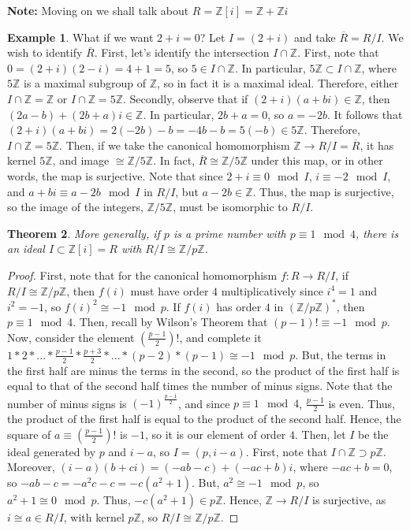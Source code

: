 \documentclass[12pt]{article}
\newtheorem{thm}{Theorem}[section]
\theoremstyle{definition}
\newtheorem{eg}[thm]{Example}
\theoremstyle{remark}
\numberwithin{equation}{section}
\newcommand\Z{\mathbb Z}    %
\begin{document}
\vspace{15pt}

\textbf{Note:} Moving on we shall talk about $R = \Z[i] = \Z + \Z i$


\begin{eg}
        What if we want $2+i = 0$? Let $I = (2+i)$ and take $\overline{R} = R/I$. We wish to identify $\overline{R}$. First, let's identify the intersection $I \cap \Z$. First, note that $0 = (2+i)(2-i) = 4+1 = 5$, so $5 \in I\cap \Z$. In particular, $5\Z \subset I\cap \Z$, where $5\Z$ is a maximal subgroup of $\Z$, so in fact it is a maximal ideal. Therefore, either $I\cap \Z = \Z$ or $I\cap \Z = 5\Z$. Secondly, observe that if $(2+i)(a+bi) \in \Z$, then $(2a-b)+(2b+a)i \in \Z$. In particular, $2b+a = 0$, so $a = -2b$. It follows that $(2+i)(a+bi) = 2(-2b)-b = -4b - b = 5(-b) \in 5\Z$. Therefore, $I\cap \Z = 5\Z$. Then, if we take the canonical homomorphism $\Z\rightarrow R/I = \overline{R}$, it has kernel $5\Z$, and image $\cong \Z/5\Z$. In fact, $\overline{R} \cong \Z/5\Z$ under this map, or in other words, the map is surjective. Note that since $2+i \equiv 0 \mod I$, $i \equiv -2 \mod I$, and $a+bi \equiv a-2b \mod I$ in $R/I$, but $a-2b \in \Z$. Thus, the map is surjective, so the image of the integers, $\Z/5\Z$, must be isomorphic to $R/I$.
\end{eg}

\vspace{15pt}


\begin{thm}
        More generally, if $p$ is a prime number with $p\equiv 1 \mod 4$, there is an ideal $I \subset \Z[i]=R$ with $R/I \cong \Z/p\Z$.
\end{thm}
\begin{proof}
        First, note that for the canonical homomorphism $f:R\rightarrow R/I$, if $R/I \cong \Z/p\Z$, then $f(i)$ must have order $4$ multiplicatively since $i^4 = 1$ and $i^2 = -1$, so $f(i)^2 \cong -1 \mod p$. If $f(i)$ has order $4$ in $(\Z/p\Z)^*$, then $p \equiv 1 \mod 4$. Then, recall by Wilson's Theorem that $(p-1)! \equiv -1 \mod p$. Now, consider the element $\left(\frac{p-1}{2}\right)!$, and complete it $1*2*...*\frac{p-1}{2}*\frac{p+3}{2}*...*(p-2)*(p-1) \cong -1 \mod p$. But, the terms in the first half are minus the terms in the second, so the product of the first half is equal to that of the second half times the number of minus signs. Note that the number of minus signs is $(-1)^{\frac{p-1}{2}}$, and since $p \equiv 1 \mod 4$, $\frac{p-1}{2}$ is even. Thus, the product of the first half is equal to the product of the second half. Hence, the square of $a\equiv\left(\frac{p-1}{2}\right)!$ is $-1$, so it is our element of order $4$. Then, let $I$ be the ideal generated by $p$ and $i-a$, so $I = (p,i-a)$. First, note that $I\cap \Z \supset p\Z$. Moreover, $(i-a)(b+ci) = (-ab-c)+(-ac+b)i$, where $-ac +b = 0$, so $-ab-c = -a^2c-c = -c(a^2+1)$. But, $a^2 \cong -1 \mod p$, so $a^2 + 1 \cong 0 \mod p$. Thus, $-c(a^2+1) \in p\Z$. Hence, $\Z\rightarrow R/I$ is surjective, as $i\cong a \in R/I$, with kernel $p\Z$, so $R/I\cong \Z/p\Z$.
\end{proof}
\end{document}
